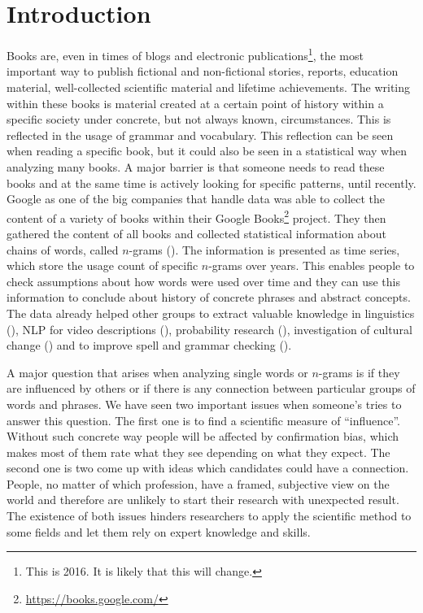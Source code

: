 \chapter{Introduction}
\label{ch:Introduction}

Books are, even in times of blogs and electronic publications\footnote{This is 2016. It is likely that this will change.}, the most important way to publish fictional and non-fictional stories, reports, education material, well-collected scientific material and lifetime achievements. The writing within these books is material created at a certain point of history within a specific society under concrete, but not always known, circumstances. This is reflected in the usage of grammar and vocabulary. This reflection can be seen when reading a specific book, but it could also be seen in a statistical way when analyzing many books. A major barrier is that someone needs to read these books and at the same time is actively looking for specific patterns, until recently. Google as one of the big companies that handle data was able to collect the content of a variety of books within their Google Books\footnote{\url{https://books.google.com/}} project. They then gathered the content of all books and collected statistical information about chains of words, called $n$-grams (\cite{Google_nGrams}). The information is presented as time series, which store the usage count of specific $n$-grams over years. This enables people to check assumptions about how words were used over time and they can use this information to conclude about history of concrete phrases and abstract concepts. The data already helped other groups to extract valuable knowledge in linguistics (\cite{others1,others5,others7}), NLP for video descriptions (\cite{others2}), probability research (\cite{others3,others6}), investigation of cultural change (\cite{others4}) and to improve spell and grammar checking (\cite{languagetool}).

A major question that arises when analyzing single words or $n$-grams is if they are influenced by others or if there is any connection between particular groups of words and phrases. We have seen two important issues when someone's tries to answer this question. The first one is to find a scientific measure of \enquote{influence}. Without such concrete way people will be affected by confirmation bias, which makes most of them rate what they see depending on what they expect. The second one is two come up with ideas which candidates could have a connection. People, no matter of which profession, have a framed, subjective view on the world and therefore are unlikely to start their research with unexpected result. The existence of both issues hinders researchers to apply the scientific method to some fields and let them rely on expert knowledge and skills.

